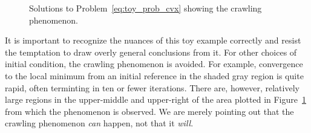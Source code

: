 \documentclass[letterpaper, 10 pt, conference]{ieeeconf}
\begin{document}
\begin{figure}
\centering
{} 
\caption{Solutions to Problem~\eqref{eq:toy_prob_cvx} showing the crawling phenomenon.}
\label{fig:toy_prob_soln}
\end{figure}


It is important to recognize the nuances of this toy example correctly and resist the temptation to draw overly general conclusions from it. For other choices of initial condition, the crawling phenomenon is avoided. For example, convergence to the local minimum from an initial reference in the shaded gray region is quite rapid, often terminting in ten or fewer iterations. There are, however, relatively large regions in the upper-middle and upper-right of the area plotted in Figure~\ref{fig:toy_prob_soln} from which the phenomenon is observed. We are merely pointing out that the crawling phenomenon \textit{can} happen, not that it \textit{will}. 
\end{document}
